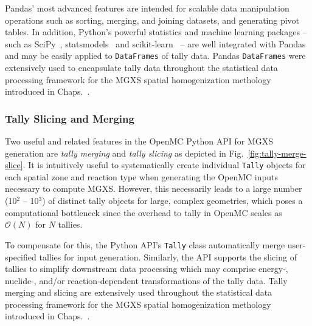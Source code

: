 Pandas' most advanced features are intended for scalable data manipulation operations such as sorting, merging, and joining datasets, and generating pivot tables. In addition, Python's powerful statistics and machine learning packages -- such as SciPy~\cite{jones2011scipy}, statsmodels~\cite{seabold2010statsmodels} and scikit-learn~\cite{pedregosa2011sklearn} -- are well integrated with Pandas and may be easily applied to \texttt{DataFrames} of tally data. Pandas \texttt{DataFrames} were extensively used to encapsulate tally data throughout the statistical data processing framework for the \ac{MGXS} spatial homogenization methology introduced in Chaps.~.

\subsubsection{Tally Slicing and Merging}
\label{subsubsec:chap4-tally-slice-merge}

Two useful and related features in the OpenMC Python \ac{API} for \ac{MGXS} generation are \textit{tally merging} and \textit{tally slicing} as depicted in Fig.~\ref{fig:tally-merge-slice}. It is intuitively useful to systematically create individual \texttt{Tally} objects for each spatial zone and reaction type when generating the OpenMC inputs necessary to compute \ac{MGXS}. However, this necessarily leads to a large number (10$^2$ -- 10$^3$) of distinct tally objects for large, complex geometries, which poses a computational bottleneck since the overhead to tally in OpenMC scales as $\mathcal{O}(N)$ for $N$ tallies. 

To compensate for this, the Python \ac{API}'s \texttt{Tally} class automatically merge user-specified tallies for input generation. Similarly, the \ac{API} supports the slicing of tallies to simplify downstream data processing which may comprise energy-, nuclide-, and/or reaction-dependent transformations of the tally data. Tally merging and slicing are extensively used throughout the statistical data processing framework for the \ac{MGXS} spatial homogenization methology introduced in Chaps.~.

